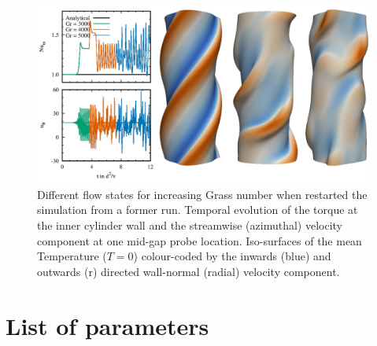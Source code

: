 \documentclass[a4paper, 11pt, DIV=11]{scrartcl}
\begin{document}
\begin{figure}[htb]
\centering
\includegraphics[width=1.00\textwidth]{figures/tc0073/compareGrasshof.png}
\caption{Different flow states for increasing Grass number when restarted
the simulation from a former run. Temporal evolution of the torque at the inner
cylinder wall and the streamwise (azimuthal) velocity component at one mid-gap
probe location. Iso-surfaces of the mean Temperature ($T=0$) colour-coded by the
inwards (blue) and outwards (r) directed wall-normal (radial) velocity component.}
\label{fig:compareGrass}
\end{figure}

\appendix

\section{List of parameters}
\label{sec:listOfParameters}
\end{document}
